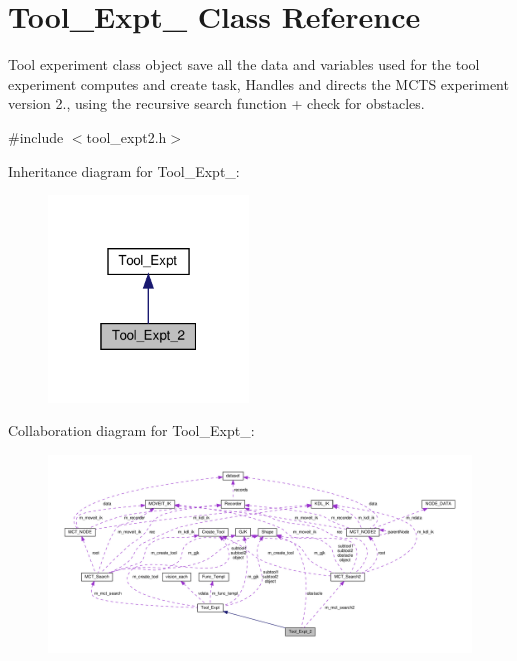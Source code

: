 \hypertarget{classTool__Expt__2}{}\section{Tool\+\_\+\+Expt\+\_ Class Reference}
\label{classTool__Expt__2}


Tool experiment class object save all the data and variables used for the tool experiment computes and create task, Handles and directs the M\+C\+TS experiment version 2., using the recursive search function + check for obstacles.  




{\ttfamily \#include $<$tool\+\_\+expt2.\+h$>$}



Inheritance diagram for Tool\+\_\+\+Expt\+\_\+:
\nopagebreak
\begin{figure}[H]
\begin{center}
\leavevmode
\includegraphics[width=151pt]{classTool__Expt__2__inherit__graph}
\end{center}
\end{figure}


Collaboration diagram for Tool\+\_\+\+Expt\+\_\+:
\nopagebreak
\begin{figure}[H]
\begin{center}
\leavevmode
\includegraphics[width=350pt]{classTool__Expt__2__coll__graph}
\end{center}
\end{figure}
